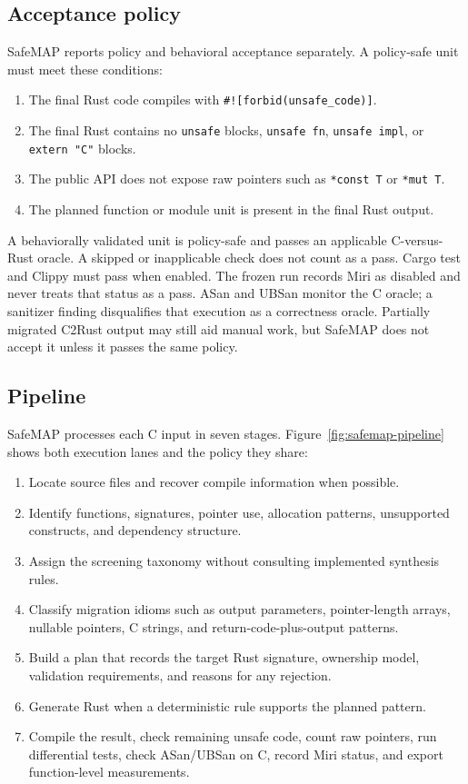 \documentclass[conference]{IEEEtran}
\newcommand{\tool}{SafeMAP\xspace}
\begin{document}
\subsection{Acceptance policy}
\label{sec:acceptance-policy}

\tool reports policy and behavioral acceptance separately. A policy-safe unit
must meet these conditions:

\begin{enumerate}
  \item The final Rust code compiles with \texttt{\#![forbid(unsafe\_code)]}.
  \item The final Rust contains no \texttt{unsafe} blocks, \texttt{unsafe fn},
  \texttt{unsafe impl}, or \texttt{extern "C"} blocks.
  \item The public API does not expose raw pointers such as \texttt{*const T}
  or \texttt{*mut T}.
  \item The planned function or module unit is present in the final Rust output.
\end{enumerate}

A behaviorally validated unit is policy-safe and passes an applicable
C-versus-Rust oracle. A skipped or inapplicable check does not count as a pass.
Cargo test and Clippy must pass when enabled. The frozen run records Miri as
disabled and never treats that status as a pass. ASan and UBSan monitor the C oracle; a
sanitizer finding disqualifies that execution as a correctness oracle.
Partially migrated C2Rust output may still aid manual work, but \tool does not
accept it unless it passes the same policy.

\subsection{Pipeline}

\tool processes each C input in seven stages.
Figure~\ref{fig:safemap-pipeline} shows both execution lanes and the policy they
share:

\begin{enumerate}
  \item Locate source files and recover compile information when possible.
  \item Identify functions, signatures, pointer use, allocation patterns,
  unsupported constructs, and dependency structure.
  \item Assign the screening taxonomy without consulting implemented synthesis
  rules.
  \item Classify migration idioms such as output
  parameters, pointer-length arrays, nullable pointers, C strings, and
  return-code-plus-output patterns.
  \item Build a plan that records the target Rust signature, ownership model,
  validation requirements, and reasons for any rejection.
  \item Generate Rust when a deterministic rule supports the planned pattern.
  \item Compile the result, check remaining unsafe code, count raw pointers, run
  differential tests, check ASan/UBSan on C, record Miri status, and export
  function-level measurements.
\end{enumerate}
\end{document}
